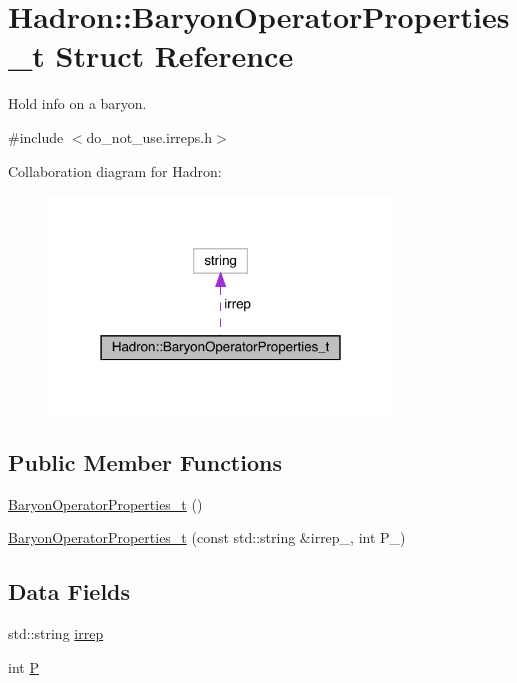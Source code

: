\hypertarget{structHadron_1_1BaryonOperatorProperties__t}{}\section{Hadron\+:\+:Baryon\+Operator\+Properties\+\_\+t Struct Reference}
\label{structHadron_1_1BaryonOperatorProperties__t}


Hold info on a baryon.  




{\ttfamily \#include $<$do\+\_\+not\+\_\+use.\+irreps.\+h$>$}



Collaboration diagram for Hadron\+:\nopagebreak
\begin{figure}[H]
\begin{center}
\leavevmode
\includegraphics[width=259pt]{d7/d2d/structHadron_1_1BaryonOperatorProperties__t__coll__graph}
\end{center}
\end{figure}
\subsection*{Public Member Functions}
\begin{DoxyCompactItemize}
\item 
\mbox{\hyperlink{structHadron_1_1BaryonOperatorProperties__t_a473494cc88a9f80c5a54b487f2d6d768}{Baryon\+Operator\+Properties\+\_\+t}} ()
\item 
\mbox{\hyperlink{structHadron_1_1BaryonOperatorProperties__t_abeb72a1861d69240e37cbe96b936eef5}{Baryon\+Operator\+Properties\+\_\+t}} (const std\+::string \&irrep\+\_\+, int P\+\_\+)
\end{DoxyCompactItemize}
\subsection*{Data Fields}
\begin{DoxyCompactItemize}
\item 
std\+::string \mbox{\hyperlink{structHadron_1_1BaryonOperatorProperties__t_a4356cd638575da7c5dd5e43fdeed7130}{irrep}}
\item 
int \mbox{\hyperlink{structHadron_1_1BaryonOperatorProperties__t_abb8040bfa73ba989712f04a7d723da10}{P}}
\end{DoxyCompactItemize}



